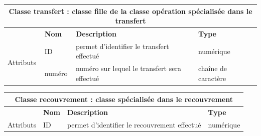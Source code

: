 		
		\begin{center}
			{\renewcommand{\arraystretch}{1.5}\begin{tabularx}{\textwidth}{|l|l|l|X|}
					\hline
					\multicolumn{4}{|c|}{\textbf{Classe transfert : classe fille de la classe opération spécialisée dans le transfert}} \\
					
					\hline
					
					& \textbf{Nom} & \textbf{Description} & \textbf{Type} \\
					\multirow{3}{*}{Attributs} & ID & permet d'identifier le transfert effectué & numérique \\
					
					& numéro & numéro sur lequel le transfert sera effectué & chaîne de caractère\\
					
					\hline
			\end{tabularx}}
			\label{table15}
		\end{center}
		
		
		\begin{center}
			{\renewcommand{\arraystretch}{1.5}\begin{tabularx}{\textwidth}{|l|l|l|X|}
				\hline
				\multicolumn{4}{|c|}{\textbf{Classe recouvrement : classe spécialisée dans le recouvrement}} \\
				
				\hline
				
				& \textbf{Nom} & \textbf{Description} & \textbf{Type} \\
				\multirow{1}{*}{Attributs} & ID & permet d'identifier le recouvrement effectué & numérique \\
				\hline
			\end{tabularx}}
			\label{table16}
		\end{center}
		
